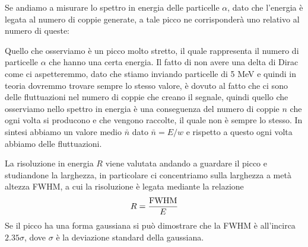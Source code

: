 Se andiamo a misurare lo spettro in energia delle particelle $\alpha$, dato che l'energia è legata al numero di coppie generate, a tale picco ne corrisponderà uno relativo al numero di queste:

\begin{figure}[H]
   \centering
\end{figure}

Quello che osserviamo è un picco molto stretto, il quale rappresenta il numero di particelle $\alpha$ che hanno una certa energia. Il fatto di non avere una delta di Dirac come ci aspetteremmo, dato che stiamo inviando particelle di 5 MeV e quindi in teoria dovremmo trovare sempre lo stesso valore, è dovuto al fatto che ci sono delle fluttuazioni nel numero di coppie che creano il segnale, quindi quello che osserviamo nello spettro in energia è una conseguenza del numero di coppie $n$ che ogni volta si producono e che vengono raccolte, il quale non è sempre lo stesso. In sintesi abbiamo un valore medio $\bar{n}$ dato $\bar{n}=E/w$ e rispetto a questo ogni volta abbiamo delle fluttuazioni.

La risoluzione in energia $R$ viene valutata andando a guardare il picco e studiandone la larghezza, in particolare ci concentriamo sulla larghezza a metà altezza FWHM, a cui la risoluzione è legata mediante la relazione
\begin{equation*}
   R=\frac{\rm FWHM}{E}
\end{equation*}
Se il picco ha una forma gaussiana si può dimostrare che la FWHM è all'incirca $2.35 \sigma$, dove $\sigma$ è la deviazione standard della gaussiana.

